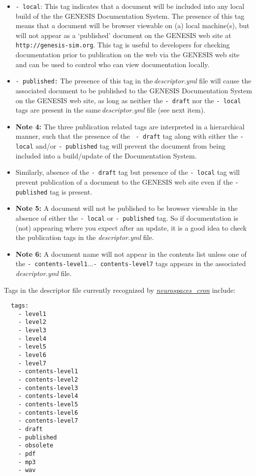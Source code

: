 \documentclass[12pt]{article}
\begin{document}
\begin{enumerate}
\begin{enumerate}
\begin{itemize}
	\item[]{\tt -\,local}: This tag indicates that a document will be included into any local build of the the GENESIS Documentation 
	System. The presence of this tag means that a document will be browser viewable on (a) local machine(s), but will not appear as a `published' 
	document on the GENESIS web site at {\tt http://genesis-sim.org}. This tag is useful to developers for checking documentation prior to publication on the web via the GENESIS web site and can be used to control who can view documentation locally.
	
	\item[]{\tt -\,published:} The presence of this tag in the\,{\it descriptor.yml} file will cause the associated document to be published to the GENESIS Documentation System on the GENESIS web site, as long as neither the {\tt -\,draft} nor the {\tt -\,local} tags are present in the same\,{\it descriptor.yml} file (see next item).
	
	\item[]{\bf Note 4:} The three publication related tags are interpreted in a hierarchical manner, such that the presence of the {\tt 
	-\,draft} tag along with either the {\tt -\,local} and/or {\tt -\,published} tag will prevent the document from being included into a 
	build/update of the Documentation System.
		
	\item[]Similarly, absence of the {\tt -\,draft} tag but presence of the {\tt -\,local} tag will prevent publication of a document to the 
	GENESIS web site even if the {\tt -\,published} tag is present.
	
	\item[] {\bf Note 5:} A document will not be published to be browser viewable in the absence of either the {\tt -\,local} or {\tt -\,published} tag. So if documentation is (not) appearing where you expect after an update, it is a good idea to check the 
	publication tags in the {\it descriptor.yml} file.
	\item[] {\bf Note 6:} A document name will not appear in the contents list unless one of the {\tt -\,contents-level1}$\ldots${\tt -\,contents-level7} tags appears in the associated {\it descriptor.yml} file.
\end{itemize}

Tags in the descriptor file currently recognized by \href{../neurospaces\_cron/neurospaces\_cron.tex}{\it neurospaces\_cron} include:
\begin{verbatim}
  tags:
    - level1
    - level2
    - level3
    - level4
    - level5
    - level6
    - level7
    - contents-level1
    - contents-level2
    - contents-level3
    - contents-level4
    - contents-level5
    - contents-level6
    - contents-level7
    - draft
    - published
    - obsolete
    - pdf
    - mp3
    - wav    
\end{verbatim}


\end{enumerate}
\end{enumerate}
\end{document}
